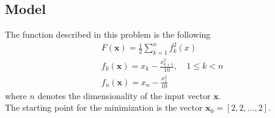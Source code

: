 \subsection*{Model}
The function described in this problem is the following
\begin{equation*}
    \begin{aligned}
    & F(\mathbf{x}) = \frac{1}{2} \sum_{k=1}^{n} f_k^2(x) \\
    & f_k(\mathbf{x}) = x_k - \frac{x_{k+1}^2}{10}, \quad   1 \leq k < n \\   
    & f_n(\mathbf{x}) = x_n - \frac{x_1^2}{10}
    \end{aligned}
\end{equation*}
where $n$ denotes the dimensionality of the input vector $\mathbf{x}$.
\\ The starting point for the minimization is the vector $\mathbf{x}_0 = [2, 2, \ldots, 2]$.


